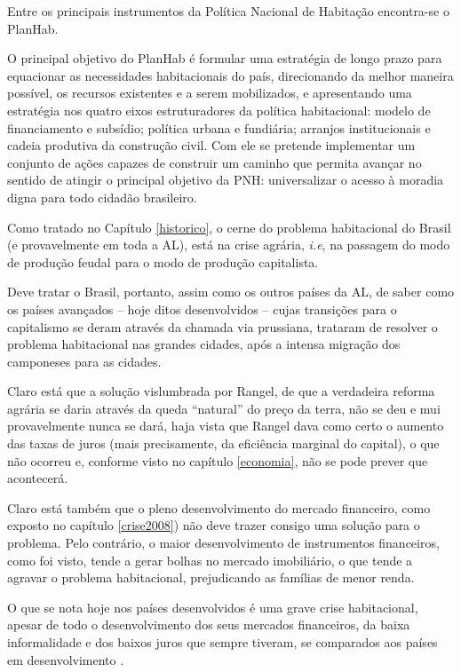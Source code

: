 \documentclass[
	12pt,				%
	oneside,			%
	a4paper,			%
	chapter=TITLE,		%
	section=TITLE,		%
	english,			%
	brazil				%
	]{abntex2}
\begin{document}
\begin{refsection}
Entre os principais instrumentos da Política Nacional de Habitação encontra-se o
\gls{PlanHab}.
\begin{citacao}
O principal objetivo do PlanHab é formular uma estratégia de longo prazo para
equacionar as necessidades habitacionais do país, direcionando da melhor maneira
possível, os recursos existentes e a serem mobilizados, e apresentando uma
estratégia nos quatro eixos estruturadores da política habitacional: modelo de
financiamento e subsídio; política urbana e fundiária; arranjos institucionais e
cadeia produtiva da construção civil. Com ele se pretende implementar um
conjunto de ações capazes de construir um caminho que permita avançar no sentido
de atingir o principal objetivo da PNH: universalizar o acesso à moradia digna
para todo cidadão brasileiro.
\cite[p. 9]{planhab}
\end{citacao}
Como tratado no Capítulo \ref{historico}, o cerne do problema habitacional
do Brasil (e provavelmente em toda a \gls{AL}), está na crise agrária,
\emph{i.e}, na passagem do modo de produção feudal para o modo de produção
capitalista.

Deve tratar o Brasil, portanto, assim como os outros países da \gls{AL},
de saber como os países avançados -- hoje ditos desenvolvidos -- cujas
transições para o capitalismo se deram através da chamada via prussiana,
trataram de resolver o problema habitacional nas grandes cidades, após a intensa
migração dos camponeses para as cidades.

Claro está que a solução vislumbrada por Rangel, de que a verdadeira reforma
agrária se daria através da queda ``natural'' do preço da terra, não se deu e mui
provavelmente nunca se dará, haja vista que Rangel dava como certo o aumento das
taxas de juros (mais precisamente, da eficiência marginal do capital), o que não
ocorreu e, conforme visto no capítulo \ref{economia}, não se pode prever que
acontecerá.

Claro está também que o pleno desenvolvimento do mercado financeiro, como
exposto no capítulo \ref{crise2008}) não deve trazer consigo
uma solução para o problema. Pelo contrário, o maior desenvolvimento de
instrumentos financeiros, como foi visto, tende a gerar bolhas no mercado
imobiliário, o que tende a agravar o problema habitacional, prejudicando as
famílias de menor renda.

O que se nota hoje nos países desenvolvidos é uma grave crise habitacional,
apesar de todo o desenvolvimento dos seus mercados financeiros, da baixa
informalidade e dos baixos juros que sempre tiveram, se comparados aos países em
desenvolvimento \autocite{housing-europe,california}.


\end{refsection}
\end{document}
